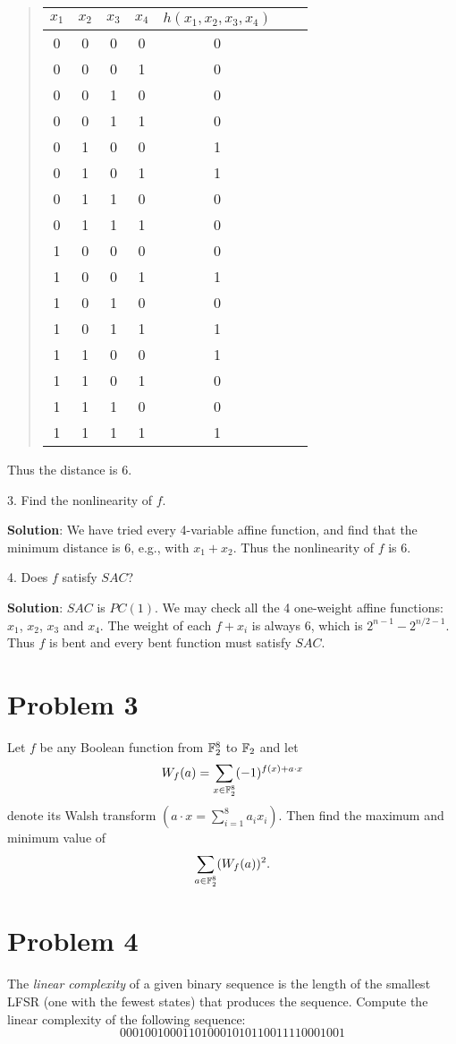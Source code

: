 \documentclass[12pt]{article}
\theoremstyle{plain}
\begin{document}
\begin{quote}
\begin{tabular}{c c c c| c || c || c }
$x_1$ & $x_2$ & $x_3$ & $x_4$ & $h(x_1, x_2, x_3, x_4)$ \\
\hline
0 & 0 & 0 & 0 & 0 \\
0 & 0 & 0 & 1 & 0 \\
0 & 0 & 1 & 0 & 0 \\
0 & 0 & 1 & 1 & 0 \\
0 & 1 & 0 & 0 & 1 \\
0 & 1 & 0 & 1 & 1 \\
0 & 1 & 1 & 0 & 0 \\
0 & 1 & 1 & 1 & 0 \\
1 & 0 & 0 & 0 & 0 \\
1 & 0 & 0 & 1 & 1 \\
1 & 0 & 1 & 0 & 0 \\
1 & 0 & 1 & 1 & 1 \\
1 & 1 & 0 & 0 & 1 \\
1 & 1 & 0 & 1 & 0 \\
1 & 1 & 1 & 0 & 0 \\
1 & 1 & 1 & 1 & 1 \\
\end{tabular}
\end{quote}
Thus the distance is 6.

3. Find the nonlinearity of $f$.

{\bf Solution}: We have tried every 4-variable affine function, and find that the minimum distance is 6, e.g., with $x_1 + x_2$. Thus the nonlinearity of $f$ is 6.

4. Does $f$ satisfy $SAC$?

{\bf Solution}: $SAC$ is $PC(1)$. We may check all the 4 one-weight affine functions: $x_1$, $x_2$, $x_3$ and $x_4$. The weight of each $f+x_i$ is always 6, which is $2^{n-1} - 2^{n/2-1}$. Thus $f$ is bent and every bent function must satisfy $SAC$.


\section{Problem 3}
Let $f$ be any Boolean function from $\mathbb{F}_2^8$ to $\mathbb{F}_2$ and let 
$$W_f(a) = \sum_{x\in \mathbb{F}_2^8} (-1)^{f(x)+a\cdot x}$$
denote its Walsh transform $(a\cdot x = \sum_{i=1}^8 a_i x_i)$. Then find the maximum and minimum value of
$$\sum_{a \in \mathbb{F}_2^8}(W_f(a))^2.$$

\section{Problem 4}
The \emph{linear complexity} of a given binary sequence is the length of the
smallest LFSR (one with the fewest states) that produces the sequence.
Compute the linear complexity of the following sequence:
$$000100100011010001010110011110001001$$
\end{document}
